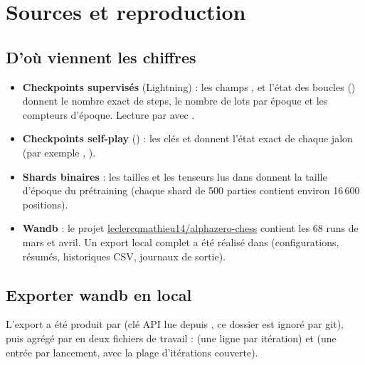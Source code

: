 \section{Sources et reproduction}

\subsection{D'où viennent les chiffres}

\begin{itemize}[leftmargin=1.2em,itemsep=3pt,topsep=2pt]
  \item \textbf{Checkpoints supervisés} (Lightning) : les champs
        ,  et l'état des boucles
        () donnent le nombre exact de steps, le nombre
        de lots par époque et les compteurs d'époque. Lecture par
         avec .
  \item \textbf{Checkpoints self-play} () : les clés
         et  donnent l'état exact de chaque
        jalon (par exemple , ).
  \item \textbf{Shards binaires} : les tailles et les tenseurs lus dans
         donnent la taille d'époque du
        prétraining (chaque shard de 500 parties contient environ 16\,600
        positions).
  \item \textbf{Wandb} : le projet
        \href{https://wandb.ai/leclercqmathieu14/alphazero-chess}{%
        leclercqmathieu14/alphazero-chess} contient les 68 runs de mars et
        avril. Un export local complet a été réalisé dans
         (configurations, résumés, historiques CSV,
        journaux de sortie).
\end{itemize}

\subsection{Exporter wandb en local}

L'export a été produit par  (clé API lue depuis
, ce dossier est ignoré par git), puis agrégé par
 en deux fichiers de travail :
 (une ligne par itération) et
 (une entrée par lancement, avec la plage
d'itérations couverte).

